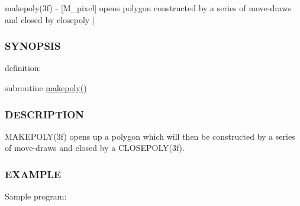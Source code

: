 makepoly(3f) -\/ \mbox{[}M\+\_\+pixel\mbox{]} opens polygon constructed by a series of move-\/draws and closed by closepoly $\vert$ 

\subsubsection*{S\+Y\+N\+O\+P\+S\+IS}

definition\+:

subroutine \hyperlink{namespacem__pixel_ab7128437f95b40004bf73fc6e3f597f8}{makepoly()}

\subsubsection*{D\+E\+S\+C\+R\+I\+P\+T\+I\+ON}

M\+A\+K\+E\+P\+O\+L\+Y(3f) opens up a polygon which will then be constructed by a series of move-\/draws and closed by a C\+L\+O\+S\+E\+P\+O\+L\+Y(3f).

\subsubsection*{E\+X\+A\+M\+P\+LE}

Sample program\+:

